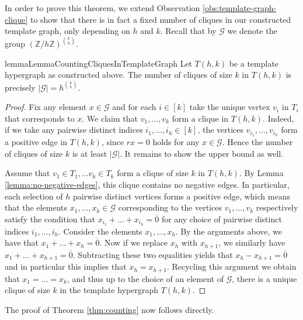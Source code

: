 \documentclass[a4paper,UKenglish,cleveref, autoref, thm-restate,numberwithinsect]{lipics-v2021}
\newcommand{\G}{\mathcal{G}}
\begin{document}
In order to prove this theorem, we extend Observation \ref{obs:template-graph-clique} to show that there is in fact a fixed number of cliques in our constructed template graph, only depending on $h$ and $k$.
Recall that by $\G$ we denote the group $\left(\mathbb Z/h\mathbb Z\right)^{\binom{k}{h}}$. 
\begin{restatable}{lemma}{LemmaCountingCliquesInTemplateGraph}
    Let $T(h,k)$ be a template hypergraph as constructed above. The number of cliques of size $k$ in $T(h,k)$ is precisely $|\G| = h^{\binom{k}{h}}$.
\end{restatable}
\begin{proof}
    Fix any element $x\in \G$ and for each $i\in [k]$ take the unique vertex $v_i$ in $T_i$ that corresponds to $x$. We claim that $v_1,\dots, v_k$ form a clique in $T(h,k)$.
    Indeed, if we take any pairwise distinct indices $i_1,\dots, i_h\in [k]$, the vertices $v_{i_1},\dots, v_{i_h}$ form a positive edge in $T(h,k)$, since $rx = 0$ holds for any $x\in \G$.
    Hence the number of cliques of size $k$ is at least $|\G|$. It remains to show the upper bound as well.

    Assume that $v_1\in T_1,\dots v_k\in T_k$ form a clique of size $k$ in $T(h,k)$. By Lemma \ref{lemma:no-negative-edges}, this clique contains no negative edges. In particular, each selection of $h$ pairwise distinct vertices forms a positive edge, which means that the elements $x_1,\dots, x_k\in \G$ corresponding to the vertices $v_1,\dots, v_k$ respectively satisfy the condition that $x_{i_1}+\dots+ x_{i_h} = \overline 0$ for any choice of pairwise distinct indices $i_1,\dots, i_h$.
    Consider the elements $x_1,\dots, x_h$. By the arguments above, we have that $x_1+\dots+x_h = \overline 0$.
    Now if we replace $x_h$ with $x_{h+1}$, we similarly have $x_1+\dots+x_{h+1} = \overline 0$.
    Subtracting these two equalities yields that $x_h-x_{h+1}= \overline 0$ and in particular this implies that $x_h=x_{h+1}$. 
    Recycling this argument we obtain that $x_1=\dots = x_{k}$, and thus up to the choice of an element of $\G$, there is a unique clique of size $k$ in the template hypergraph $T(h,k)$. 
\end{proof}

The proof of Theorem \ref{thm:counting} now follows directly.
\end{document}
